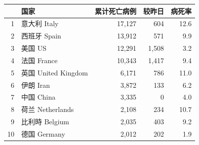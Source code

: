 \documentclass[
]{article}
\begin{document}
\begin{table}
\begin{minipage}{.6\linewidth}
\begin{table}[H]
\begin{tabular}{rlrrr}
\toprule
  & 国家 & 累计死亡病例 & 较昨日 & 病死率\\
\midrule
\rowcolor{gray!6}  1 & 意大利 Italy & 17,127 & 604 & 12.6\\
2 & 西班牙 Spain & 13,912 & 571 & 9.9\\
\rowcolor{gray!6}  3 & 美国 US & 12,291 & 1,508 & 3.2\\
4 & 法国 France & 10,343 & 1,417 & 9.4\\
\rowcolor{gray!6}  5 & 英国 United Kingdom & 6,171 & 786 & 11.0\\
6 & 伊朗 Iran & 3,872 & 133 & 6.2\\
\rowcolor{gray!6}  7 & 中国 China & 3,335 & 0 & 4.0\\
8 & 荷兰 Netherlands & 2,108 & 234 & 10.7\\
\rowcolor{gray!6}  9 & 比利時 Belgium & 2,035 & 403 & 9.2\\
10 & 德国 Germany & 2,012 & 202 & 1.9\\
\bottomrule
\end{tabular}
\endgroup{}
\end{table} \end{minipage} 
\end{table}
\end{document}
